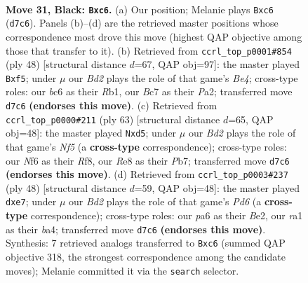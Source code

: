 \documentclass[11pt]{article}
\begin{document}
\clearpage

\begin{figure}[p]\centering
\begin{subfigure}{0.46\textwidth}\centering
\resizebox{\linewidth}{!}{%
\newchessgame
\chessboard[
  setfen={4r1k1/p1bb2pp/P1B2n2/1p3p2/5P2/1P2P1P1/5R2/RNB3K1 b - - 0 31},
  showmover=false,
  pgfstyle=straightmove, color=movearrow, markmove={d7-c6}
]}
\caption{}
\end{subfigure}\hfill
\begin{subfigure}{0.46\textwidth}\centering
\resizebox{\linewidth}{!}{%
\newchessgame
\chessboard[
  setfen={5rk1/2p3pp/3r4/p3pb2/1np1B3/B1N2N2/P5PP/1R4K1 w - - 7 25},
  showmover=false,
  pgfstyle=straightmove, color=movearrow, markmove={e4-f5}
]}
\caption{}
\end{subfigure}
\\[4pt]
\begin{subfigure}{0.46\textwidth}\centering
\resizebox{\linewidth}{!}{%
\newchessgame
\chessboard[
  setfen={5rk1/1p5p/6p1/p2N4/2p2nP1/P2bR2P/1P6/2K2B1R b - - 0 32},
  showmover=false,
  pgfstyle=straightmove, color=movearrow, markmove={f4-d5}
]}
\caption{}
\end{subfigure}\hfill
\begin{subfigure}{0.46\textwidth}\centering
\resizebox{\linewidth}{!}{%
\newchessgame
\chessboard[
  setfen={r1r3k1/3nbp1p/3P2p1/p5BP/b3P3/4PN2/4B1P1/5RK1 w - - 0 25},
  showmover=false,
  pgfstyle=straightmove, color=movearrow, markmove={d6-e7}
]}
\caption{}
\end{subfigure}
\caption{\textbf{Move 31, Black: \texttt{Bxc6}.} (a) Our position; Melanie plays \texttt{Bxc6} (\texttt{d7c6}). Panels (b)--(d) are the retrieved master positions whose correspondence most drove this move (highest QAP objective among those that transfer to it). (b) Retrieved from \texttt{ccrl\_top\_p0001\#854} (ply 48) [structural distance $d$=67, QAP obj=97]: the master played \texttt{Bxf5}; under $\mu$ our \emph{Bd2} plays the role of that game's \emph{Be4}; cross-type roles: our \emph{b}c6 as their \emph{R}b1, our \emph{B}c7 as their \emph{P}a2; transferred move \texttt{d7c6} \textbf{(endorses this move)}. (c) Retrieved from \texttt{ccrl\_top\_p0000\#211} (ply 63) [structural distance $d$=65, QAP obj=48]: the master played \texttt{Nxd5}; under $\mu$ our \emph{Bd2} plays the role of that game's \emph{Nf5} (a \textbf{cross-type} correspondence); cross-type roles: our \emph{N}f6 as their \emph{R}f8, our \emph{R}e8 as their \emph{P}b7; transferred move \texttt{d7c6} \textbf{(endorses this move)}. (d) Retrieved from \texttt{ccrl\_top\_p0003\#237} (ply 48) [structural distance $d$=59, QAP obj=48]: the master played \texttt{dxe7}; under $\mu$ our \emph{Bd2} plays the role of that game's \emph{Pd6} (a \textbf{cross-type} correspondence); cross-type roles: our \emph{p}a6 as their \emph{B}e2, our \emph{r}a1 as their \emph{b}a4; transferred move \texttt{d7c6} \textbf{(endorses this move)}. Synthesis: 7 retrieved analogs transferred to \texttt{Bxc6} (summed QAP objective 318, the strongest correspondence among the candidate moves); Melanie committed it via the \texttt{search} selector.}
\label{fig:thought-m61}
\end{figure}
\end{document}
